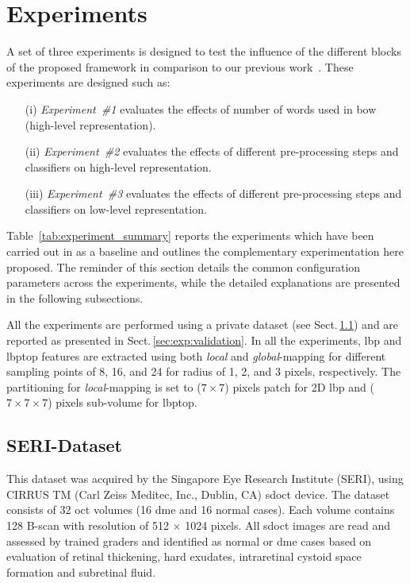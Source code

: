  \graphicspath{ {./content/experiment/figures/} }

\section{Experiments}
\label{sec:exp} 
A set of three experiments is designed to test the influence of the different blocks of the proposed framework in comparison to our previous work~\cite{Lemaintre2015miccaiOCT}.
These experiments are designed such as: 
\begin{enumerate}
\item[(i)] \emph{Experiment~\#1} evaluates the effects of number of words used in \ac{bow} (high-level representation).
\item[(ii)] \emph{Experiment~\#2} evaluates the effects of different pre-processing steps and classifiers on high-level representation.
\item[(iii)] \emph{Experiment~\#3} evaluates the effects of different pre-processing steps and classifiers on low-level representation.
\end{enumerate}
Table~\ref{tab:experiment_summary} reports the experiments which have been carried out in \cite{Lemaintre2015miccaiOCT} as a baseline and outlines the complementary experimentation here proposed.
The reminder of this section details the common configuration parameters across the experiments, while the detailed explanations are presented in the following 
subsections. 

All the experiments are performed using a private dataset (see Sect.\,\ref{sec:exp:dataset:seri}) and are reported as presented in Sect.\,\ref{sec:exp:validation}.
In all the experiments, \ac{lbp} and \ac{lbptop} features are extracted using both \emph{local} and \emph{global}-mapping for different sampling points of 8, 16, and 24 for radius of 1, 2, and 3 pixels, respectively.
The partitioning for \emph{local}-mapping is set to ($7 \times 7$) pixels patch for 2D \ac{lbp} and ($ 7 \times 7 \times 7$) pixels sub-volume for \ac{lbptop}.

\subsection{SERI-Dataset}\label{sec:exp:dataset:seri}
This dataset was acquired by the Singapore Eye Research Institute (SERI), using CIRRUS TM (Carl Zeiss Meditec, Inc., Dublin, CA) \ac{sdoct} device. The dataset consists of 32 \ac{oct} volumes (16 \ac{dme} and 16 normal cases). Each volume contains 128 B-scan with resolution of 512 $\times$ 1024 pixels.
All \ac{sdoct} images are read and assessed by trained graders and identified as normal or \ac{dme} cases based on evaluation of retinal thickening, hard exudates, intraretinal cystoid space formation and subretinal fluid.

